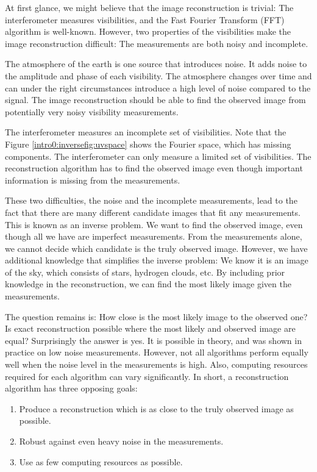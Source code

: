 At first glance, we might believe that the image reconstruction is trivial: The interferometer measures visibilities, and the Fast Fourier Transform (FFT) algorithm is well-known. However, two properties of the visibilities make the image reconstruction difficult: The measurements are both noisy and incomplete.

The atmosphere of the earth is one source that introduces noise. It adds noise to the amplitude and phase of each visibility. The atmosphere changes over time and can under the right circumstances introduce a high level of noise compared to the signal. The image reconstruction should be able to find the observed image from potentially very noisy visibility measurements.

The interferometer measures an incomplete set of visibilities. Note that the Figure \ref{intro0:inversefig:uvspace} shows the Fourier space, which has missing components. The interferometer can only measure a limited set of visibilities. The reconstruction algorithm has to find the observed image even though important information is missing from the measurements.

These two difficulties, the noise and the incomplete measurements, lead to the fact that there are many different candidate images that fit any measurements.  This is known as an inverse problem. We want to find the observed image, even though all we have are imperfect measurements. From the measurements alone, we cannot decide which candidate is the truly observed image. However, we have additional knowledge that simplifies the inverse problem: We know it is an image of the sky, which consists of stars, hydrogen clouds, etc. By including prior knowledge in the reconstruction, we can find the most likely image given the measurements. 

The question remains is: How close is the most likely image to the observed one? Is exact reconstruction possible where the most likely and observed image are equal? Surprisingly the answer is yes. It is possible in theory\cite{candes2006robust,donoho2006compressed}, and was shown in practice on low noise measurements\cite{dabbech2018cygnus, dabbech2015moresane}. However, not all algorithms perform equally well when the noise level in the measurements is high. Also, computing resources required for each algorithm can vary significantly. In short, a reconstruction algorithm has three opposing goals:
\begin{enumerate}
	\item Produce a reconstruction which is as close to the truly observed image as possible.
	\item Robust against even heavy noise in the measurements.
	\item Use as few computing resources as possible.
\end{enumerate}

